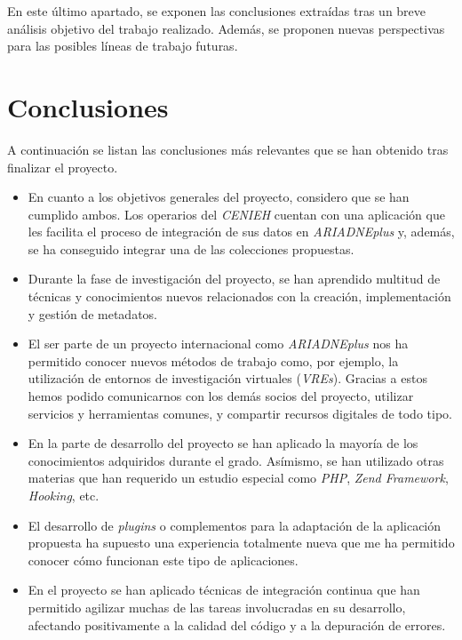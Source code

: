 
En este último apartado, se exponen las conclusiones extraídas tras un
breve análisis objetivo del trabajo realizado. Además, se proponen
nuevas perspectivas para las posibles líneas de trabajo futuras.

\section{Conclusiones}

A continuación se listan las conclusiones más relevantes que se han
obtenido tras finalizar el proyecto.

\begin{itemize}
\tightlist
\item
  En cuanto a los objetivos generales del proyecto, considero que se han
  cumplido ambos. Los operarios del \emph{CENIEH} cuentan con una
  aplicación que les facilita el proceso de integración de sus datos en
  \emph{ARIADNEplus} y, además, se ha conseguido integrar una de las
  colecciones propuestas.
\item
  Durante la fase de investigación del proyecto, se han aprendido
  multitud de técnicas y conocimientos nuevos relacionados con la
  creación, implementación y gestión de metadatos.
\item
  El ser parte de un proyecto internacional como \emph{ARIADNEplus} nos
  ha permitido conocer nuevos métodos de trabajo como, por ejemplo, la
  utilización de entornos de investigación virtuales (\emph{VREs}).
  Gracias a estos hemos podido comunicarnos con los demás socios del
  proyecto, utilizar servicios y herramientas comunes, y compartir
  recursos digitales de todo tipo.
\item
  En la parte de desarrollo del proyecto se han aplicado la mayoría de
  los conocimientos adquiridos durante el grado. Asímismo, se han
  utilizado otras materias que han requerido un estudio especial como
  \emph{PHP}, \emph{Zend Framework}, \emph{Hooking}, etc.
\item
  El desarrollo de \emph{plugins} o complementos para la adaptación de
  la aplicación propuesta ha supuesto una experiencia totalmente nueva
  que me ha permitido conocer cómo funcionan este tipo de aplicaciones.
\item
  En el proyecto se han aplicado técnicas de integración continua que
  han permitido agilizar muchas de las tareas involucradas en su
  desarrollo, afectando positivamente a la calidad del código y a la
  depuración de errores.
\end{itemize}

